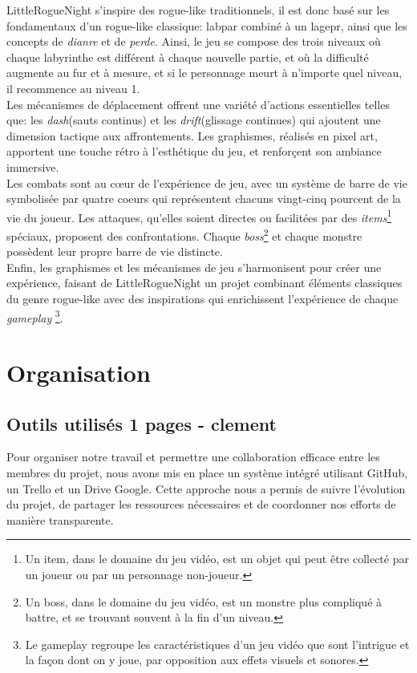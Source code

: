 \documentclass[10pt]{article}
\begin{document}
LittleRogueNight s'inspire des rogue-like traditionnels, il est donc basé sur les fondamentaux d'un rogue-like classique: \gls{labpar} combiné à un
\gls{lagepr}, ainsi que les concepts de \textit{\gls{dianre}} et de \textit{\gls{perde}}. 
Ainsi, le jeu se compose des trois niveaux où chaque labyrinthe est différent à chaque nouvelle partie, 
et où la difficulté augmente au fur et à mesure, et si le personnage meurt à n'importe quel niveau, il recommence au niveau 1.\\

Les mécanismes de déplacement offrent une variété d'actions essentielles telles que: les \textit{\gls{dash}}(sauts continus) et 
les \textit{\gls{drift}}(glissage continues) qui ajoutent une dimension tactique aux affrontements. Les graphismes, réalisés en pixel art, apportent une touche rétro à 
l'esthétique du jeu, et renforçent son ambiance immersive.\\

Les combats sont au cœur de l'expérience de jeu, avec un système de barre de vie symbolisée par quatre coeurs qui représentent chacuns vingt-cinq pourcent 
de la vie du joueur. Les attaques, qu'elles soient directes ou facilitées par des \textit{\gls{items}}\footnote{Un item, dans le domaine du jeu vidéo, est un objet qui peut être 
collecté par un joueur ou par un personnage non-joueur.} 
spéciaux, proposent des confrontations. Chaque \textit{boss}\footnote{Un boss, dans le domaine du jeu vidéo, est un monstre plus compliqué à battre, 
et se trouvant souvent à la fin d'un niveau.} et chaque monstre 
possèdent leur propre barre de vie distincte.\\

Enfin, les graphismes et les mécanismes de jeu s'harmonisent pour créer une expérience, faisant de LittleRogueNight un projet 
combinant éléments classiques du genre rogue-like avec des inspirations qui enrichissent l'expérience de chaque \textit{gameplay}
\footnote{Le gameplay regroupe les caractéristiques d'un jeu vidéo que sont l'intrigue et la façon dont on y joue, par opposition aux effets visuels et sonores. }.\\

\section{Organisation}   
\subsection{Outils utilisés 1 pages - clement}
Pour organiser notre travail et permettre une collaboration efficace entre les membres du projet, nous avons mis en place un système intégré utilisant GitHub, un Trello et un Drive Google. Cette approche nous a permis de suivre l'évolution du projet, de partager les ressources nécessaires et de coordonner nos efforts de manière transparente.
\end{document}
